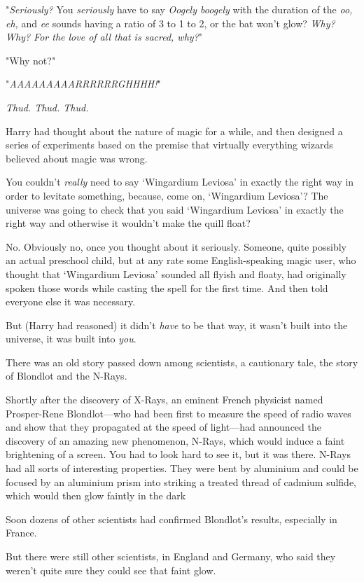 "\emph{Seriously?} You \emph{seriously} have to say \emph{Oogely boogely} with
the duration of the \emph{oo, eh,} and \emph{ee} sounds having a ratio of 3 to
1 to 2, or the bat won't glow? \emph{Why? Why? For the love of all that is
sacred, why?}"

"Why not?"

"\emph{AAAAAAAAARRRRRRGHHHH!}"

\emph{Thud. Thud. Thud.}

Harry had thought about the nature of magic for a while, and then designed a
series of experiments based on the premise that virtually everything wizards
believed about magic was wrong.

You couldn't \emph{really} need to say `Wingardium Leviosa' in exactly the
right way in order to levitate something, because, come on, `Wingardium
Leviosa'? The universe was going to check that you said `Wingardium Leviosa' in
exactly the right way and otherwise it wouldn't make the quill float?

No. Obviously no, once you thought about it seriously. Someone, quite possibly
an actual preschool child, but at any rate some English-speaking magic user,
who thought that `Wingardium Leviosa' sounded all flyish and floaty, had
originally spoken those words while casting the spell for the first time. And
then told everyone else it was necessary.

But (Harry had reasoned) it didn't \emph{have} to be that way, it wasn't built
into the universe, it was built into \emph{you}.

There was an old story passed down among scientists, a cautionary tale, the
story of Blondlot and the N-Rays.

Shortly after the discovery of X-Rays, an eminent French physicist named
Prosper-Rene Blondlot—who had been first to measure the speed of radio waves
and show that they propagated at the speed of light—had announced the
discovery of an amazing new phenomenon, N-Rays, which would induce a faint
brightening of a screen. You had to look hard to see it, but it was there.
N-Rays had all sorts of interesting properties. They were bent by aluminium and
could be focused by an aluminium prism into striking a treated thread of
cadmium sulfide, which would then glow faintly in the dark{\el}

Soon dozens of other scientists had confirmed Blondlot's results, especially in
France.

But there were still other scientists, in England and Germany, who said they
weren't quite sure they could see that faint glow.

